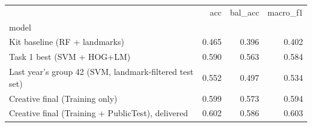 \begin{tabular}{lrrr}
\toprule
 & acc & bal_acc & macro_f1 \\
model &  &  &  \\
\midrule
Kit baseline (RF + landmarks) & 0.465 & 0.396 & 0.402 \\
Task 1 best (SVM + HOG+LM) & 0.590 & 0.563 & 0.584 \\
Last year's group 42 (SVM, landmark-filtered test set) & 0.552 & 0.497 & 0.534 \\
Creative final (Training only) & 0.599 & 0.573 & 0.594 \\
Creative final (Training + PublicTest), delivered & 0.602 & 0.586 & 0.603 \\
\bottomrule
\end{tabular}
